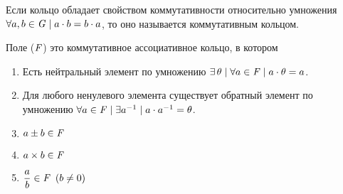 \begin{definition}
  Если кольцо обладает свойством коммутативности относительно умножения
  \(\forall a, b \in \mathit{G} \mid a \cdot b = b \cdot a\), то оно называется
  коммутативным кольцом.
\end{definition}
\begin{definition}
  Поле ($\mathit{F}$) это коммутативное ассоциативное кольцо, в котором
  \begin{enumerate}[topsep=5pt]
  \item
    Есть нейтральный элемент по умножению \(\exists \, \theta \mid \forall a \in
    \mathit{F} \mid a \cdot \theta = a\).
  \item
    Для любого ненулевого элемента существует обратный элемент по умножению
    \(\forall a \in \mathit{F} \mid \exists a^{-1} \mid a \cdot a^{-1} =
    \theta\).
  \item $a \pm b \in \mathit{F}$
  \item $a \times b \in \mathit{F}$
  \item $\dfrac{a}{b} \in \mathit{F} \,\,\, (b \neq 0)$
  \end{enumerate}
\end{definition}
